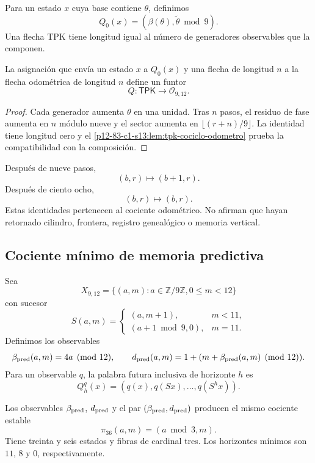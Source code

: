 Para un estado \(x\) cuya base contiene \(\theta\), definimos
\[
 Q_0(x)=(\beta(\theta),\widetilde\theta\bmod9).
\]
Una flecha TPK tiene longitud igual al número de generadores observables que
la componen.

\begin{theorem}
\label{p12-83-c1-s13:thm:tpk-funtor-fase-longitud}
La asignación que envía un estado \(x\) a \(Q_0(x)\) y una flecha de
longitud \(n\) a la flecha odométrica de longitud \(n\) define un funtor
\[
 Q:\mathsf{TPK}\longrightarrow\mathcal O_{9,12}.
\]
\end{theorem}

\begin{proof}
Cada generador aumenta \(\theta\) en una unidad. Tras \(n\) pasos, el
residuo de fase aumenta en \(n\) módulo nueve y el sector aumenta en
\(\lfloor(r+n)/9\rfloor\). La identidad tiene longitud cero y el
\cref{p12-83-c1-s13:lem:tpk-cociclo-odometro} prueba la compatibilidad con la composición.
\end{proof}

Después de nueve pasos,
\[
 (b,r)\longmapsto(b+1,r).
\]
Después de ciento ocho,
\[
 (b,r)\longmapsto(b,r).
\]
Estas identidades pertenecen al cociente odométrico. No afirman que hayan
retornado cilindro, frontera, registro genealógico o memoria vertical.

\subsection{Cociente mínimo de memoria predictiva}

Sea
\[
 X_{9,12}=\{(a,m):a\in\mathbb Z/9\mathbb Z, 0\leq m<12\}
\]
con sucesor
\[
 S(a,m)=
 \begin{cases}
  (a,m+1),&m<11,\\
  (a+1\bmod9,0),&m=11.
 \end{cases}
\]
Definimos los observables
\[
 \beta_{\rm pred}(a,m)=4a\pmod{12},
 \qquad
 d_{\rm pred}(a,m)=1+(m+\beta_{\rm pred}(a,m)\pmod{12}).
\]
Para un observable \(q\), la palabra futura inclusiva de horizonte \(h\)
es
\[
 Q_h^q(x)=(q(x),q(Sx),\ldots,q(S^hx)).
\]

\begin{theorem}
\label{p12-83-c1-s13:thm:tpk-cociente-predictivo-36}
Los observables \(\beta_{\rm pred}\), \(d_{\rm pred}\) y el par
\((\beta_{\rm pred},d_{\rm pred})\) producen el mismo cociente estable
\[
 \pi_{36}(a,m)=(a\bmod3,m).
\]
Tiene treinta y seis estados y fibras de cardinal tres. Los horizontes
mínimos son \(11\), \(8\) y \(0\), respectivamente.
\end{theorem}

